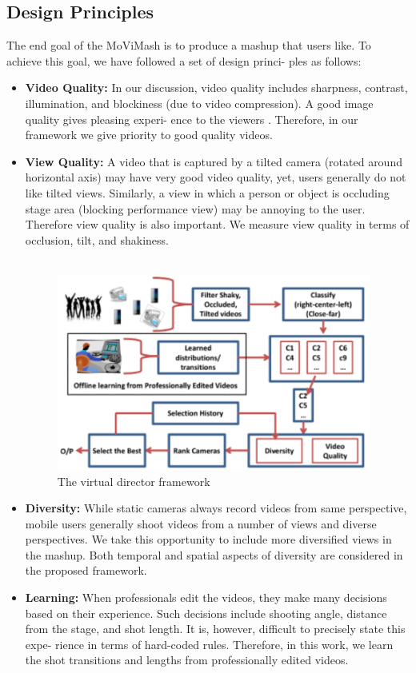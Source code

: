 \documentclass[conference]{IEEEtran}
\begin{document}
\subsection{Design Principles}
The end goal of the MoViMash is to produce a mashup that users
like. To achieve this goal, we have followed a set of design princi-
ples as follows:
\begin{itemize}
    \item \textbf{Video Quality:} In our discussion, video quality includes
sharpness, contrast, illumination, and blockiness (due to video
compression). A good image quality gives pleasing experi-
ence to the viewers \cite{10}. Therefore, in our framework we
give priority to good quality videos.

    \item \textbf{View Quality:} A video that is captured by a tilted camera
(rotated around horizontal axis) may have very good video
quality, yet, users generally do not like tilted views. Similarly, a view in which a person or object is occluding stage area (blocking performance view) may be annoying to the user. Therefore view quality is also important. We measure view quality in terms of occlusion, tilt, and shakiness.\\\\
\begin{figure}
    \centering
    \includegraphics{img2.png}
    \caption{The virtual director framework}
    \label{fig:my_label}
\end{figure}

    \item \textbf{Diversity: }While static cameras always record videos from
same perspective, mobile users generally shoot videos from
a number of views and diverse perspectives. We take this
opportunity to include more diversified views in the mashup.
Both temporal and spatial aspects of diversity are considered
in the proposed framework.
    \item \textbf{Learning:} When professionals edit the videos, they make
many decisions based on their experience. Such decisions
include shooting angle, distance from the stage, and shot
length. It is, however, difficult to precisely state this expe-
rience in terms of hard-coded rules. Therefore, in this work,
we learn the shot transitions and lengths from professionally
edited videos.
\end{itemize}
\end{document}
